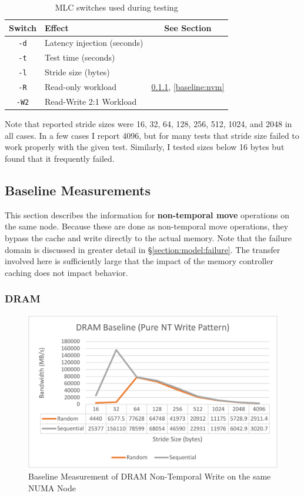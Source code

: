 \begin{table}\label{mlc:switches}
    \caption{MLC switches used during testing}
    \begin{tabular}{@{}clc@{}}
        Switch & Effect & See Section \\ \toprule
        \verb+-d+ & Latency injection (seconds) &  \\
        \verb+-t+ & Test time (seconds) &  \\
        \verb+-l+ & Stride size (bytes) & \\
        \verb+-R+ & Read-only workload & \ref{baseline:dram}, \ref{baseline:nvm} \\
        \verb+-W2+ & Read-Write 2:1 Workload &  \\ \bottomrule
    \end{tabular}%
\end{table}

Note that reported stride sizes were 16, 32, 64, 128, 256, 512, 1024, and 2048 in all cases.
In a few cases I report 4096, but for many tests that stride size failed to work properly
with the given test.  Similarly, I tested sizes below 16 bytes but found that it frequently
failed.

\subsection{Baseline Measurements}

This section describes the information for \textbf{non-temporal move} operations on the same node. Because
these are done as non-temporal move operations, they bypass the cache and write directly to the actual
memory.  Note that the failure domain is discussed in greater detail in \S \ref{section:model:failure}.
The transfer involved here is sufficiently large that the impact of the memory controller caching
does not impact behavior.

\subsubsection{DRAM}\label{baseline:dram}

\begin{figure}
    \centering
    \caption{Baseline Measurement of DRAM Non-Temporal Write on the same NUMA Node}\label{chart:baseline:dram}
    \includegraphics[width=1\textwidth]{charts/dram-baseline-nt-write-same-node-crop.pdf}
\end{figure}

